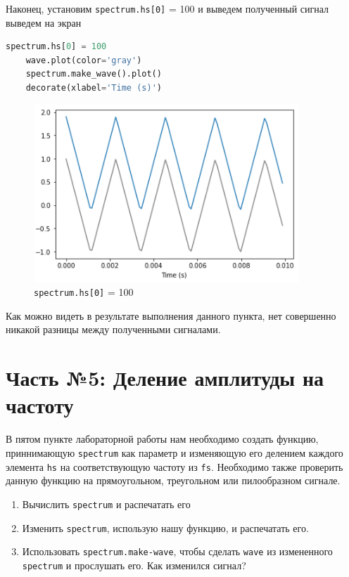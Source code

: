\documentclass[a4paper]{article}
\begin{document}
            Наконец, установим \texttt{spectrum.hs[0]} = 100 и выведем полученный сигнал выведем на экран
            
\begin{lstlisting}[language=Python, caption= \texttt{spectrum.hs[0]} = 100]
    spectrum.hs[0] = 100
    wave.plot(color='gray')
    spectrum.make_wave().plot()
    decorate(xlabel='Time (s)')
\end{lstlisting}               
            
            \begin{figure}[H]
                \centering
                \includegraphics[width=\textwidth]{ex_4_triangle_signal_compare.png}
                \caption{\texttt{spectrum.hs[0]} = 100}
                \label{fig:ex_4_triangle_signal_compare}
            \end{figure}
            
            Как можно видеть в результате выполнения данного пункта, нет совершенно никакой разницы между полученными сигналами.
    
    \newpage
        \section{Часть №5: Деление амплитуды на частоту}
            В пятом пункте лабораторной работы нам необходимо создать функцию, приннимающую \texttt{spectrum} как параметр и изменяющую его делением каждого элемента \texttt{hs} на соответствующую частоту из \texttt{fs}.
            Необходимо также проверить данную функцию на прямоугольном, треугольном или пилообразном сигнале.
            
                \begin{enumerate}
                    \item Вычислить \texttt{spectrum} и распечатать его
                    \item Изменить \texttt{spectrum}, использую нашу функцию, и распечатать его.
                    \item Использовать \texttt{spectrum.make-wave}, чтобы сделать \texttt{wave} из измененного \texttt{spectrum} и прослушать его. Как изменился сигнал?
                \end{enumerate}
                
\end{document}
